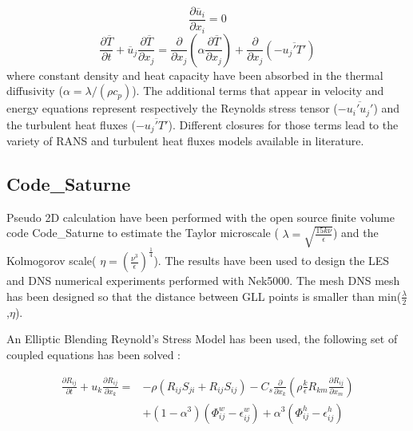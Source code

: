 \documentclass[11pt,letterpaper,english]{article}
\begin{document}
\begin{equation}
\frac{\partial \overline{u}_i}{\partial x_i} = 0
\label{rhoEqnRANS}
\end{equation}
\begin{equation}
 \frac{\partial \overline{T} }{\partial t} + \overline{u}_j \frac{\partial \overline{T}}{\partial x_j}  = \frac{\partial }{\partial x_j} \left( \alpha \frac{\partial \overline{T}}{\partial x_j} \right) +\frac{\partial}{\partial x_j} \left( -\overline{u_j' T'}\right)
\label{EEqnRANS}
\end{equation}
where constant density and heat capacity have been absorbed in the thermal diffusivity ($\alpha = \lambda / (\rho c_p)$). The additional terms that appear in velocity and energy equations represent respectively the Reynolds stress tensor ($-\overline{u_i' u_j'} $) and the turbulent heat fluxes ($ -\overline{u_j' T'}$). Different closures for those terms lead to the variety of RANS and turbulent heat fluxes models available in literature.

\subsection{Code\_Saturne}

Pseudo 2D calculation have been performed with the open source finite volume code Code\_Saturne to estimate the Taylor microscale ( $ \lambda = \sqrt{\frac{15 k \nu}{\epsilon}} $) and the Kolmogorov scale( $ \eta = (\frac{\nu^{3}}{\epsilon})^{\frac{1}{4}}$). The results have been used to design the LES and DNS numerical experiments performed with Nek5000. The mesh DNS mesh has been designed so that the distance between GLL points is smaller than min($\frac{\lambda}{2}$,$\eta$).

An Elliptic Blending Reynold's Stress Model\cite{manceau2002} has been used, the following set of coupled equations has been solved : 


\begin{equation}
\begin{split}
  \frac{\partial R_{ij}}{\partial t} + u_{k}\frac{\partial R_{ij}}{\partial x_{k}} = & -\rho ( R_{ij}S_{ji} + R_{ij}S_{ij} ) - C_{s} \frac{\partial}{\partial x_{k}}( \rho\frac{k}{\epsilon} R_{km}\frac{\partial R_{ij}}{\partial x_{m}}) \\ 
  & + (1-\alpha^{3})(\Phi_{ij}^{w} -\epsilon_{ij}^{w}) + \alpha^{3}(\Phi_{ij}^{h} - \epsilon_{ij}^{h})
\end{split}
\end{equation}
\end{document}
